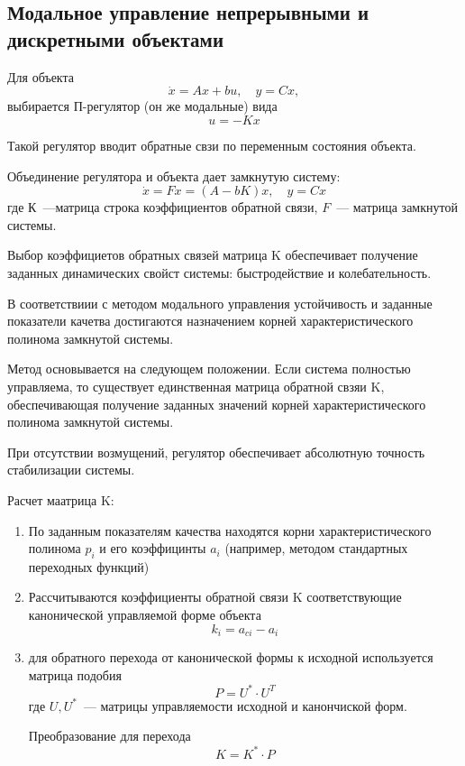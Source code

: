 \subsection{Модальное 	управление непрерывными и дискретными объектами}

Для объекта
\begin{equation}
    \dot x = A x + bu, \quad y = Cx,
\end{equation}
выбирается П-регулятор (он же модальные) вида
\begin{equation}
    u = - K x
\end{equation}

Такой регулятор вводит обратные свзи по переменным состояния объекта.

Объединение регулятора и объекта дает замкнутую систему:
\begin{equation}
    \dot x = F x = (A - bK) x, \quad y = C x
\end{equation}
где $К$~---матрица строка коэффициентов обратной связи, $F$~--- матрица замкнутой системы.

Выбор коэффициетов обратных связей матрица K обеспечивает получение заданных динамических свойст системы: быстродействие и колебательность.

В соответствиии с методом модального управления устойчивость и заданные показатели качетва достигаются назначением корней характеристического полинома замкнутой системы.

Метод основывается на следующем положении. Если система полностью управляема, то существует единственная матрица обратной свзяи K, обеспечивающая получение заданных значений корней характеристического полинома замкнутой системы.

При отсутствии возмущений, регулятор обеспечивает абсолютную точность стабилизации системы.

Расчет маатрица K:
\begin{enumerate}
    \item По заданным показателям качества находятся корни характеристического полинома $p_i$ и его коэффицинты $a_i$ (например, методом стандартных переходных функций)
    \item Рассчитываются коэффициенты обратной связи K соответствующие канонической управляемой форме объекта
    \begin{equation}
        k_i = a_{ci} - a_i        
    \end{equation}
    \item для обратного перехода от канонической формы к исходной используется матрица подобия
    \begin{equation}
        P = U^* \cdot U^{T}
    \end{equation}
    где $U, U^*$~--- матрицы управляемости исходной и канончиской форм.
    
    Преобразование для перехода 
    \begin{equation}
        K = K^* \cdot P
    \end{equation}
\end{enumerate}


